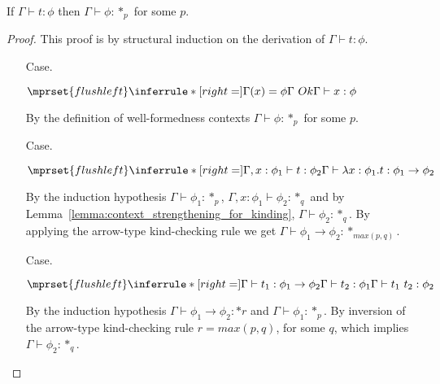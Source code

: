 \begin{lemma}[Regularity]
  If $\Gamma \vdash t:\phi$ then $\Gamma \vdash \phi:*_p$ for some $p$.
  \label{lemma:regularity_ssf}
\end{lemma}
\begin{proof}
  This proof is by structural induction on the derivation of $\Gamma \vdash t:\phi$.
\begin{itemize}
\item[Case.] \ \\
  \begin{center}
    \begin{math}
      $$\mprset{flushleft}
      \inferrule* [right=] {
        \Gamma(x) = \phi
        \\
        \Gamma\ Ok
      }{\Gamma \vdash x : \phi}
    \end{math}  
  \end{center}
  By the definition of well-formedness contexts $\Gamma \vdash \phi:*_p$ for some $p$.
  
\item[Case.] \ \\
  \begin{center}
    \begin{math}
      $$\mprset{flushleft}
      \inferrule* [right=] {
        \Gamma,x : \phi_1 \vdash t : \phi_2
      }{\Gamma \vdash \lambda x : \phi_1.t : \phi_1 \rightarrow \phi_2}
    \end{math}
  \end{center}
  By the induction hypothesis $\Gamma \vdash \phi_1:*_p$,
  $\Gamma,x:\phi_1 \vdash \phi_2:*_q$ and by Lemma~\ref{lemma:context_strengthening_for_kinding},
  $\Gamma \vdash \phi_2:*_q$.
  By applying the arrow-type kind-checking rule we get 
  $\Gamma \vdash \phi_1 \rightarrow \phi_2:*_{max(p,q)}$.
  
\item[Case.] \ \\
  \begin{center}
    \begin{math}
      $$\mprset{flushleft}
      \inferrule* [right=] {
        \Gamma \vdash t_1 : \phi_1 \rightarrow \phi_2 
        \\
        \Gamma \vdash t_2 : \phi_1
      }{\Gamma \vdash t_1\ t_2 : \phi_2}
    \end{math}
  \end{center}
  By the induction hypothesis $\Gamma \vdash \phi_1 \rightarrow \phi_2:*r$ and
  $\Gamma \vdash \phi_1:*_p$.  By inversion of the arrow-type kind-checking rule 
  $r = max(p,q)$, for some $q$, which implies $\Gamma \vdash \phi_2:*_q$.
  

\end{itemize}
\end{proof}
